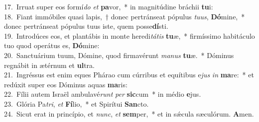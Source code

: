 {17.~}Irruat super eos formí\textit{do} \textit{et} \textbf{pa}vor,~* in magnitúdine bráchii \textbf{tu}i:\\
{18.~}Fiant immóbiles quasi lapis,~† donec pertránseat pópulus \textit{tu}\textit{us}, \textbf{Dó}mine,~* donec pertránseat pópulus tuus iste, quem posse\textbf{dí}sti.\\
{19.~}Introdúces eos, et plantábis in monte heredi\textit{tá}\textit{tis} \textbf{tu}æ,~* firmíssimo habitáculo tuo quod operátus es, \textbf{Dó}mine:\\
{20.~}Sanctuárium tuum, Dómine, quod firmavérunt \textit{ma}\textit{nus} \textbf{tu}æ.~* Dóminus regnábit in ætérnum et \textbf{ul}tra.\\
{21.~}Ingréssus est enim eques Phárao cum cúrribus et equítibus e\textit{jus} \textit{in} \textbf{ma}re:~* et redúxit super eos Dóminus aquas \textbf{ma}ris:\\
{22.~}Fílii autem Israël ambulavé\textit{runt} \textit{per} \textbf{sic}cum~* in médio \textbf{e}jus.\\
{23.~}Glória Pa\textit{tri}, \textit{et} \textbf{Fí}lio,~* et Spirítui \textbf{San}cto.\\
{24.~}Sicut erat in princípio, et \textit{nunc}, \textit{et} \textbf{sem}per,~* et in sǽcula sæculórum. \textbf{A}men.\\
